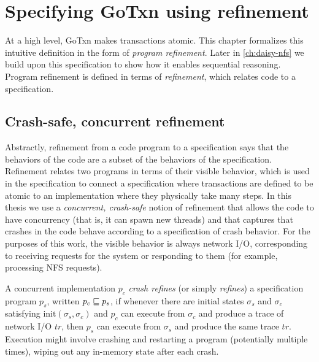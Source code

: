 \section{Specifying GoTxn using refinement}%
\label{sec:txn:spec}

At a high level, GoTxn makes transactions atomic. This chapter formalizes this
intuitive definition in the form of \emph{program refinement}. Later in
\cref{ch:daisy-nfs} we build upon this specification to show how it enables
sequential reasoning. Program refinement is defined in terms of
\emph{refinement}, which relates code to a specification.

\subsection{Crash-safe, concurrent refinement}%
\label{sec:txn:refinement-def}

Abstractly, refinement from a code program to a specification says that the
behaviors of the code are a subset of the behaviors of the specification.
Refinement relates two programs in terms of their visible behavior, which is
used in the specification to connect a specification where transactions are
defined to be atomic to an implementation where they physically take many steps.
In this thesis we use a \emph{concurrent, crash-safe} notion of refinement that
allows the code to have concurrency (that is, it can spawn new threads) and that
captures that crashes in the code behave according to a specification of crash
behavior. For
the purposes of this work, the visible behavior is always network I/O,
corresponding to receiving requests for the system or responding to them (for
example, processing NFS requests).

\begin{definition}
  A concurrent implementation $p_{c}$ \emph{crash refines} (or simply
\emph{refines}) a specification program $p_{s}$,
written $p_{c} \sqsubseteq p_{s}$, if whenever there are initial states
$\sigma_{s}$ and $\sigma_{c}$ satisfying $\mathrm{init}(\sigma_{s}, \sigma_{c})$
and $p_{c}$ can execute from $\sigma_{c}$ and produce a trace of network I/O
$\textit{tr}$, then $p_{s}$ can execute from $\sigma_{s}$ and produce the same trace
$\textit{tr}$.  Execution might involve crashing and restarting a program (potentially
multiple times), wiping out any in-memory state after each crash.
  \label{def:refinement}
\end{definition}

